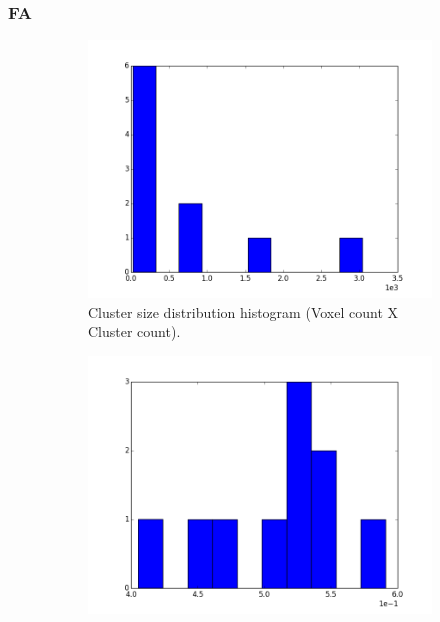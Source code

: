 \documentclass[a4paper,11pt]{report}
\begin{document}
    \subsubsection{FA}
    \begin{figure}[!ht]
      \centering

      \begin{subfigure}[t]{.49\textwidth}
        \includegraphics[width=1\linewidth]{img/histograms/fa_clustered_fa_mask_region_sizes_hist.png}
        \caption{Cluster size distribution histogram (Voxel count X Cluster count).}
        \label{subfig:fa_hist_region}
      \end{subfigure}\hfill%
      \begin{subfigure}[t]{.49\textwidth}
        \includegraphics[width=1\linewidth]{img/histograms/fa_clustered_fa_mask_fa_means_hist.png}

\end{subfigure}
\end{figure}
\end{document}
